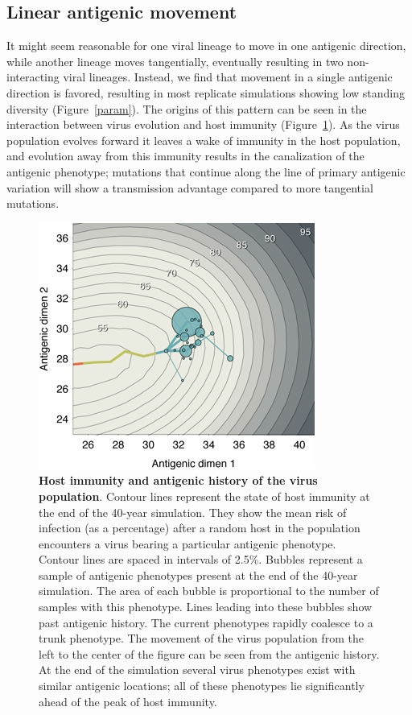 \documentclass[11pt,oneside,letterpaper]{article}
\begin{document}
\subsection*{Linear antigenic movement}

It might seem reasonable for one viral lineage to move in one antigenic direction, while another lineage moves tangentially, eventually resulting in two non-interacting viral lineages.  Instead, we find that movement in a single antigenic direction is favored, resulting in most replicate simulations showing low standing diversity (Figure~\ref{param}).  The origins of this pattern can be seen in the interaction between virus evolution and host immunity (Figure~\ref{immunity}).  As the virus population evolves forward it leaves a wake of immunity in the host population, and evolution away from this immunity results in the canalization of the antigenic phenotype; mutations that continue along the line of primary antigenic variation will show a transmission advantage compared to more tangential mutations.  

\begin{figure}[tb]
	\centering
	\includegraphics{figures/immunity}
	\caption{\textbf{Host immunity and antigenic history of the virus population}.  Contour lines represent the state of host immunity at the end of the 40-year simulation.  They show the mean risk of infection (as a percentage) after a random host in the population encounters a virus bearing a particular antigenic phenotype.  Contour lines are spaced in intervals of 2.5\%. Bubbles represent a sample of antigenic phenotypes present at the end of the 40-year simulation.  The area of each bubble is proportional to the number of samples with this phenotype.  Lines leading into these bubbles show past antigenic history.  The current phenotypes rapidly coalesce to a trunk phenotype.  The movement of the virus population from the left to the center of the figure can be seen from the antigenic history.  At the end of the simulation several virus phenotypes exist with similar antigenic locations; all of these phenotypes lie significantly ahead of the peak of host immunity.}
	\label{immunity}
\end{figure}
\end{document}
